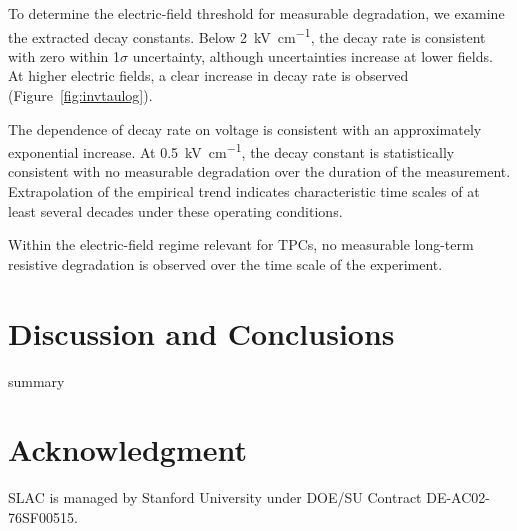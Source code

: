 \documentclass[a4paper,12pt]{article}
\begin{document}
To determine the electric-field threshold for measurable degradation, we examine the extracted decay constants. 
Below \SI{2}{\kilo\volt\per\centi\metre}, the decay rate is consistent with zero within 1$\sigma$ uncertainty, although uncertainties increase at lower fields. 
At higher electric fields, a clear increase in decay rate is observed (Figure~\ref{fig:invtaulog}).


The dependence of decay rate on voltage is consistent with an approximately exponential increase. 
At \SI{0.5}{\kilo\volt\per\centi\metre}, the decay constant is statistically consistent with no measurable degradation over the duration of the measurement. 
Extrapolation of the empirical trend indicates characteristic time scales of at least several decades under these operating conditions.

Within the electric-field regime relevant for TPCs, no measurable long-term resistive degradation is observed over the time scale of the experiment.

\section{Discussion and Conclusions}
\label{sec:sum}


summary

\section{Acknowledgment} 

SLAC is managed by Stanford University under DOE/SU Contract DE-AC02-76SF00515.

\clearpage


\end{document}
